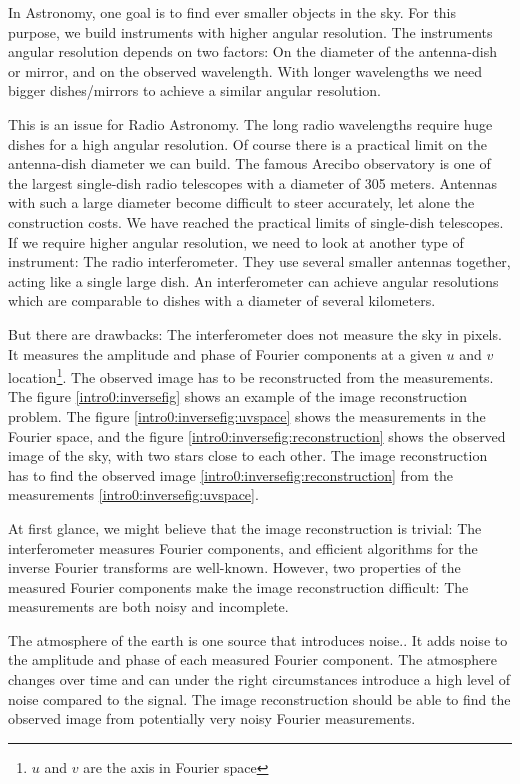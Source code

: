 In Astronomy, one goal is to find ever smaller objects in the sky. For this purpose, we build instruments with higher angular resolution. The instruments angular resolution depends on two factors: On the diameter of the antenna-dish or mirror, and on the observed wavelength. With longer wavelengths we need bigger dishes/mirrors to achieve a similar angular resolution. 

This is an issue for Radio Astronomy. The long radio wavelengths require huge dishes for a high angular resolution. Of course there is a practical limit on the antenna-dish diameter we can build. The famous Arecibo observatory is one of the largest single-dish radio telescopes with a diameter of 305 meters. Antennas with such a large diameter become difficult to steer accurately, let alone the construction costs. We have reached the practical limits of single-dish telescopes. If we require higher angular resolution, we need to look at another type of instrument: The radio interferometer. They use several smaller antennas together, acting like a single large dish. An interferometer can achieve angular resolutions which are comparable to dishes with a diameter of several kilometers.

But there are drawbacks: The interferometer does not measure the sky in pixels. It measures the amplitude and phase of Fourier components at a given $u$ and $v$ location\footnote{$u$ and $v$ are the axis in Fourier space}. The observed image has to be reconstructed from the measurements. The figure \ref{intro0:inversefig} shows an example of the image reconstruction problem. The figure \ref{intro0:inversefig:uvspace} shows the measurements in the Fourier space, and the figure \ref{intro0:inversefig:reconstruction} shows the observed image of the sky, with two stars close to each other. The image reconstruction has to find the observed image \ref{intro0:inversefig:reconstruction} from the measurements \ref{intro0:inversefig:uvspace}. 

At first glance, we might believe that the image reconstruction is trivial: The interferometer measures Fourier components, and efficient algorithms for the inverse Fourier transforms are well-known. However, two properties of the measured Fourier components make the image reconstruction difficult: The measurements are both noisy and incomplete.

The atmosphere of the earth is one source that introduces noise.. It adds noise to the amplitude and phase of each measured Fourier component. The atmosphere changes over time and can under the right circumstances introduce a high level of noise compared to the signal. The image reconstruction should be able to find the observed image from potentially very noisy Fourier measurements.

